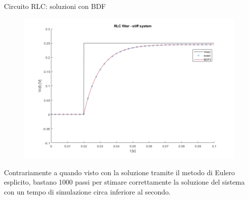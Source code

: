 \documentclass[aspectratio=169, 10pt, handout,usenames,dvipsnames]{beamer}
\begin{document}
 \begin{frame}{Circuito RLC: soluzioni con BDF}
    \begin{figure}
        \centering
        \includegraphics[width=.68\linewidth]{rlc_solution_comparison.png}
        \label{fig:rlc_bdf_solution}
    \end{figure}
    
    Contrariamente a quando visto con la soluzione tramite il metodo di Eulero esplicito, bastano 1000 passi per stimare correttamente la soluzione del sistema con un tempo di simulazione circa inferiore al  secondo.
 \end{frame}
 
 

\end{document}
